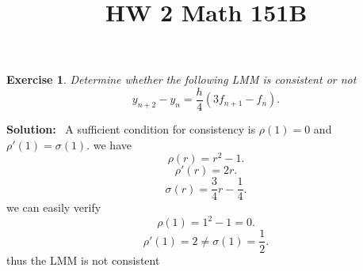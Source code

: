 \documentclass[a4paper,12pt]{scrartcl} %
\newenvironment{solution}
  {\par\color{answercolor}\textbf{Solution:}\ }
  {\par}
\newcounter{customcounter}
\theoremstyle{darktheorem}
\newtheorem{exercise}[customcounter]{Exercise}
\begin{document}
\title{\color{sectioncolor}HW 2 Math 151B}
\author{}
\date{}
\maketitle

\thispagestyle{fancy}
\begin{exercise}
    Determine whether the following LMM is consistent or not
    \[
        y_{n+2}-y_n = \frac{h}{4}(3f_{n+1}-f_n)
    .\] 
\end{exercise}
\begin{solution}
    A sufficient condition for consistency is $\rho(1) = 0$ and $\rho'(1) = \sigma(1)$.
    we have
    \[
    \rho(r) = r^2 - 1
    .\] 
    \[
    \rho'(r) = 2r
    .\] 
    \[
    \sigma(r) = \frac{3}{4}r - \frac{1}{4}
    .\] 
    we can easily verify
    \[
    \rho(1) = 1^2 - 1 = 0
    .\] 
    \[
    \rho'(1) = 2 \ne \sigma(1) = \frac{1}{2}
    .\] 
    thus the LMM is not consistent
\end{solution}
\end{document}
